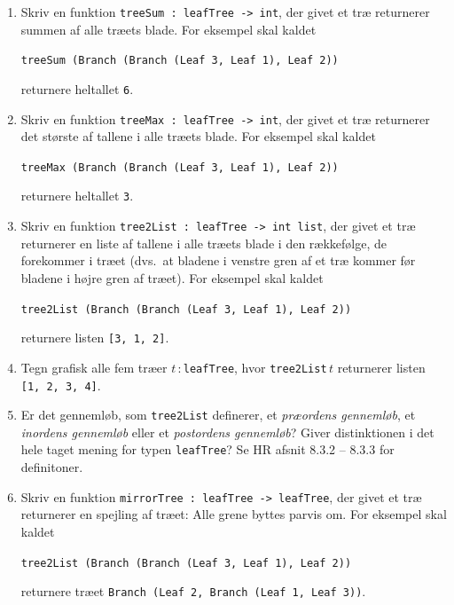 \documentclass[a4paper,12pt]{article}
\begin{document}
\begin{enumerate}[{5}T1]
\item Skriv en funktion \lstinline{treeSum : leafTree -> int}, der
  givet et træ returnerer summen af alle træets blade.  For
  eksempel skal kaldet

  \lstinline{treeSum (Branch (Branch (Leaf 3, Leaf 1), Leaf 2))}

  returnere heltallet \lstinline{6}.

\item Skriv en funktion \lstinline{treeMax : leafTree -> int}, der
  givet et træ returnerer det største af tallene i alle træets blade.
  For eksempel skal kaldet

  \lstinline{treeMax (Branch (Branch (Leaf 3, Leaf 1), Leaf 2))}

  returnere heltallet \lstinline{3}.

\item Skriv en funktion \lstinline{tree2List : leafTree -> int list},
  der givet et træ returnerer en liste af tallene i alle træets blade
  i den rækkefølge, de forekommer i træet (dvs.\ at bladene i venstre
  gren af et træ kommer før bladene i højre gren af træet).  For
  eksempel skal kaldet

  \lstinline{tree2List (Branch (Branch (Leaf 3, Leaf 1), Leaf 2))}

  returnere listen \lstinline{[3, 1, 2]}.

\item Tegn grafisk alle fem træer $t$\,:\,\lstinline{leafTree}, hvor
  \lstinline{tree2List}\,$t$ returnerer listen \lstinline{[1, 2, 3, 4]}.

\item Er det gennemløb, som \lstinline{tree2List} definerer, et
  \emph{præordens gennemløb}, et \emph{inordens gennemløb} eller et
  \emph{postordens gennemløb}?  Giver distinktionen i det hele taget
  mening for typen \lstinline{leafTree}?  Se HR afsnit 8.3.2 -- 8.3.3
  for definitoner.

\item Skriv en funktion \lstinline{mirrorTree : leafTree -> leafTree},
  der givet et træ returnerer en spejling af træet: Alle grene byttes
  parvis om.  For eksempel skal kaldet

  \lstinline{tree2List (Branch (Branch (Leaf 3, Leaf 1), Leaf 2))}

  returnere træet \lstinline{Branch (Leaf 2, Branch (Leaf 1, Leaf 3))}.


\end{enumerate}
\end{document}
